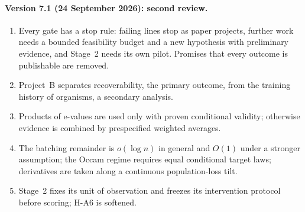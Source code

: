 \documentclass[11pt,a4paper]{article}
\begin{document}
\paragraph{Version 7.1 (24 September 2026): second review.}
\begin{enumerate}[leftmargin=*]
\item Every gate has a stop rule: failing lines stop as paper projects,
further work needs a bounded feasibility budget and a new hypothesis with
preliminary evidence, and Stage~2 needs its own pilot. Promises that every
outcome is publishable are removed.
\item Project~B separates recoverability, the primary outcome, from the
training history of organisms, a secondary analysis.
\item Products of e-values are used only with proven conditional validity;
otherwise evidence is combined by prespecified weighted averages.
\item The batching remainder is $o(\log n)$ in general and $O(1)$ under a
stronger assumption; the Occam regime requires equal conditional target
laws; derivatives are taken along a continuous population-loss tilt.
\item Stage~2 fixes its unit of observation and freezes its intervention
protocol before scoring; H-A6 is softened.
\end{enumerate}
\end{document}
